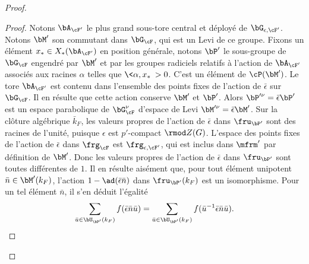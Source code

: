 \begin{proof}
\begin{proof}
Notons $\bA_{\cF'}$ le plus grand sous-tore central et déployé de $\bG_{\epsilon,\cF'}$. Notons $\bM'$ son commutant dans $\bG_{\cF}$, qui est un Levi de ce groupe. Fixons un élément $x_{*}\in X_{*}(\bA_{\cF'})$ en position générale, notons $\bP'$ le sous-groupe de $\bG_{\cF}$ engendré par $\bM'$ et par les groupes radiciels relatifs à l'action de $\bA_{\cF'}$ associés aux racines $\alpha$ telles que $\<\alpha,x_{*}\>>0$. C'est un élément de $\cP(\bM')$.
Le tore $\bA_{\cF'}$ est contenu dans l'ensemble des points fixes de l'action de $\bar{\epsilon}$ sur $\bG_{\cF}$. Il en résulte que cette action conserve $\bM'$ et $\bP'$. Alors $\bP^{\prime\nu}=\bar{\epsilon}\bP'$ est un espace parabolique de $\bG^{\nu}_{\cF}$ d'espace de Levi $\bM^{\prime\nu}=\bar{\epsilon}\bM'$. Sur la clôture algébrique $\bar{k}_{F}$, les valeurs propres de l'action de $\bar{\epsilon}$ dans $\boldsymbol{\fru}_{\bP'}$ sont des racines de l'unité, puisque $\epsilon$ est $p'$-compact $\rmod Z(G)$. L'espace des points fixes de l'action de $\bar{\epsilon}$ dans $\boldsymbol{\frg}_{\cF}$ est $\boldsymbol{\frg}_{\epsilon,\cF'}$, qui est inclus dans $\boldsymbol{\mfrm}'$ par définition de $\bM'$. Donc les valeurs propres de l'action de $\bar{\epsilon}$ dans $\boldsymbol{\fru}_{\bP'}$ sont toutes différentes de $1$. Il en résulte aisément que, pour tout élément unipotent $\bar{n}\in \bM'(k_{F})$, l'action $1-\ad(\bar{\epsilon}\bar{n})$ dans $\boldsymbol{\fru}_{\bP'}(k_{F})$ est un isomorphisme. Pour un tel élément $\bar{n}$, il s'en déduit l'égalité\vspace*{-3pt}\enlargethispage{.2\baselineskip}%
\[
\sum_{\bar{u}\in \bU_{\bP'}(k_{F})}f(\bar{\epsilon}\bar{n}\bar{u})=\sum_{\bar{u}\in \bU_{\bP'}(k_{F})}f(\bar{u}^{-1}\bar{\epsilon}\bar{n}\bar{u}).
\]

\end{proof}
\end{proof}
